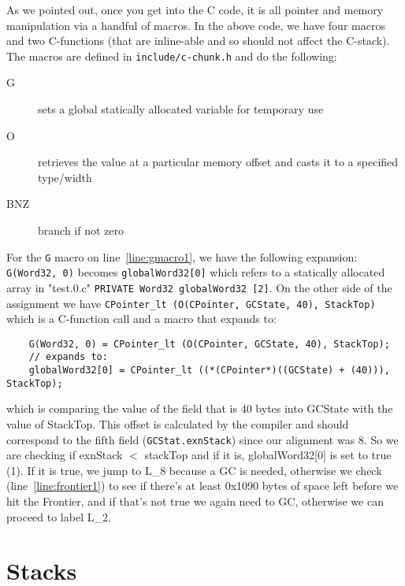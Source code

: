 As we pointed out, once you get into the C code, it is all pointer and memory manipulation via a handful of macros. In the above code, we have four macros and two C-functions (that are inline-able and so should not affect the C-stack). The macros are defined in \texttt{include/c-chunk.h} and do the following:

\begin{description}
\item[G] sets a global statically allocated variable for temporary use
\item[O] retrieves the value at a particular memory offset and casts it to a specified type/width
\item[BNZ] branch if not zero
\end{description}

For the \texttt{G} macro on line~\ref{line:gmacro1}, we have the following expansion:
\texttt{G(Word32, 0)} becomes \texttt{globalWord32[0]} which refers to a statically allocated array in "test.0.c" \texttt{PRIVATE Word32 globalWord32 [2]}. On the other side of the assignment we have \texttt{CPointer\_lt (O(CPointer, GCState, 40), StackTop)} which is a C-function call and a macro that expands to:

\begin{minipage}{\linewidth}
\lstset{language=C,numbers=none,frame=none}\begin{lstlisting}
    G(Word32, 0) = CPointer_lt (O(CPointer, GCState, 40), StackTop);
    // expands to:
    globalWord32[0] = CPointer_lt ((*(CPointer*)((GCState) + (40))), StackTop);
\end{lstlisting}
\end{minipage}

which is comparing the value of the field that is 40 bytes into GCState with the value of StackTop. This offset is calculated by the compiler and should correspond to the fifth field (\texttt{GCStat.exnStack}) since our alignment was 8. So we are checking if exnStack $<$ stackTop and if it is, globalWord32[0] is set to true (1). If it is true, we jump to L\_8 because a GC is needed, otherwise we check (line~\ref{line:frontier1}) to see if there's at least 0x1090 bytes of space left before we hit the Frontier, and if that's not true we again need to GC, otherwise we can proceed to label L\_2.

\section{Stacks}

